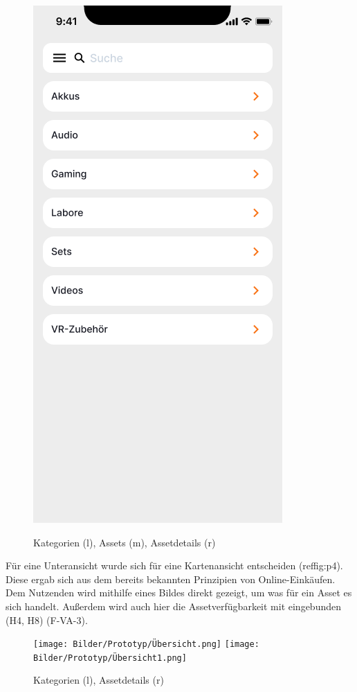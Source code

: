 \begin{figure}[h]
    \includegraphics[scale=0.3]{Bilder/Prototyp/Neu/Kategorein 1.png}
    \label{fig:p1}
    \caption[Mockup: Kategorien, Assets, Assetdetails]{Kategorien (l), Assets (m), Assetdetails (r)}
\end{figure}

Für eine Unteransicht wurde sich für eine Kartenansicht entscheiden (ref{fig:p4}). Diese ergab sich aus dem
bereits bekannten Prinzipien von Online-Einkäufen. Dem Nutzenden wird mithilfe eines Bildes direkt
gezeigt, um was für ein Asset es sich handelt. Außerdem wird auch hier die Assetverfügbarkeit mit
eingebunden (H4, H8) (F-VA-3).

\begin{figure}[h]
    \centering
    \texttt{[image: Bilder/Prototyp/Übersicht.png]}\hspace{2em}
    \texttt{[image: Bilder/Prototyp/Übersicht1.png]}
    \label{fig:p4}
    \caption[Mockup: Kategorien, Assets, Assetdetails]{Kategorien (l), Assetdetails (r)}
\end{figure}


